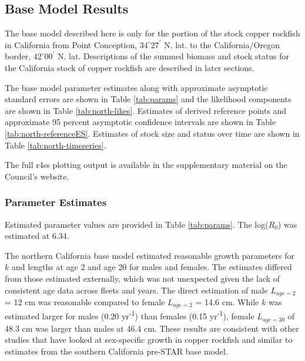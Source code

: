 \documentclass[11pt,
  english,
  letterpaper,
]{article}
\begin{document}
\newcommand{\lt}{\ensuremath <}
\newcommand{\gt}{\ensuremath >}

\linenumbers

\newcommand\CapeM{$40^\circ 10^\prime$ N. lat.}
\newcommand\PtC{$34^\circ 27^\prime$ N. lat.}
\newcommand\CAOR{$42^\circ 00^\prime$ N. lat.}

\hypertarget{base-model-results}{%
\subsection{Base Model Results}\label{base-model-results}}

The base model described here is only for the portion of the stock copper rockfish in California from Point Conception, $34^\circ 27^\prime$ N. lat. to the California/Oregon border, $42^\circ 00^\prime$ N. lat. Descriptions of the summed biomass and stock status for the California stock of copper rockfish are described in later sections.

The base model parameter estimates along with approximate asymptotic standard errors are shown in Table \ref{tab:params} and the likelihood components are shown in Table \ref{tab:north-likes}. Estimates of derived reference points and approximate 95 percent asymptotic confidence intervals are shown in Table \ref{tab:north-referenceES}. Estimates of stock size and status over time are shown in Table \ref{tab:north-timeseries}.

The full r4ss plotting output is available in the supplementary material on the Council's website.

\hypertarget{parameter-estimates}{%
\subsubsection{Parameter Estimates}\label{parameter-estimates}}

Estimated parameter values are provided in Table \ref{tab:params}. The log(\(R_0\)) was estimated at 6.34.

The northern California base model estimated reasonable growth parameters for \(k\) and lengths at age 2 and age 20 for males and females. The estimates differed from those estimated externally, which was not unexpected given the lack of consistent age data across fleets and years. The direct estimation of male \(L_{age=2}\) = 12 cm was reasonable compared to female \(L_{age=2}\) = 14.6 cm. While \(k\) was estimated larger for males (0.20 yr\textsuperscript{-1}) than females (0.15 yr\textsuperscript{-1}), female \(L_{age=30}\) of 48.3 cm was larger than males at 46.4 cm. These results are consistent with other studies that have looked at sex-specific growth in copper rockfish and similar to estimates from the southern California pre-STAR base model.
\end{document}
